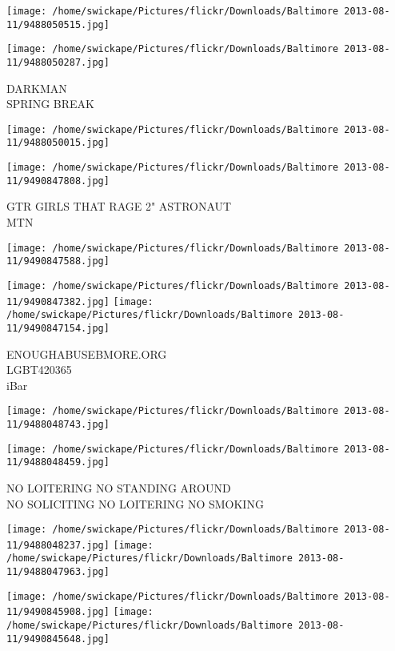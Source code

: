 \documentclass[10pt,letterpaper]{article}
\begin{document}
\texttt{[image: /home/swickape/Pictures/flickr/Downloads/Baltimore 2013-08-11/9488050515.jpg]}

\vspace{0.25in}
\texttt{[image: /home/swickape/Pictures/flickr/Downloads/Baltimore 2013-08-11/9488050287.jpg]}

DARKMAN\\
SPRING BREAK\\
\pagebreak

\texttt{[image: /home/swickape/Pictures/flickr/Downloads/Baltimore 2013-08-11/9488050015.jpg]}

\vspace{0.25in}
\texttt{[image: /home/swickape/Pictures/flickr/Downloads/Baltimore 2013-08-11/9490847808.jpg]}

GTR GIRLS THAT RAGE 2" ASTRONAUT\\
MTN\\
\pagebreak

\texttt{[image: /home/swickape/Pictures/flickr/Downloads/Baltimore 2013-08-11/9490847588.jpg]}

\vspace{0.25in}
\texttt{[image: /home/swickape/Pictures/flickr/Downloads/Baltimore 2013-08-11/9490847382.jpg]}
\texttt{[image: /home/swickape/Pictures/flickr/Downloads/Baltimore 2013-08-11/9490847154.jpg]}

ENOUGHABUSEBMORE.ORG\\
LGBT420365\\
iBar\\
\pagebreak

\texttt{[image: /home/swickape/Pictures/flickr/Downloads/Baltimore 2013-08-11/9488048743.jpg]}

\vspace{0.25in}
\texttt{[image: /home/swickape/Pictures/flickr/Downloads/Baltimore 2013-08-11/9488048459.jpg]}

NO LOITERING NO STANDING AROUND\\
NO SOLICITING NO LOITERING NO SMOKING\\
\pagebreak

\texttt{[image: /home/swickape/Pictures/flickr/Downloads/Baltimore 2013-08-11/9488048237.jpg]}
\texttt{[image: /home/swickape/Pictures/flickr/Downloads/Baltimore 2013-08-11/9488047963.jpg]}

\texttt{[image: /home/swickape/Pictures/flickr/Downloads/Baltimore 2013-08-11/9490845908.jpg]}
\texttt{[image: /home/swickape/Pictures/flickr/Downloads/Baltimore 2013-08-11/9490845648.jpg]}
\end{document}
